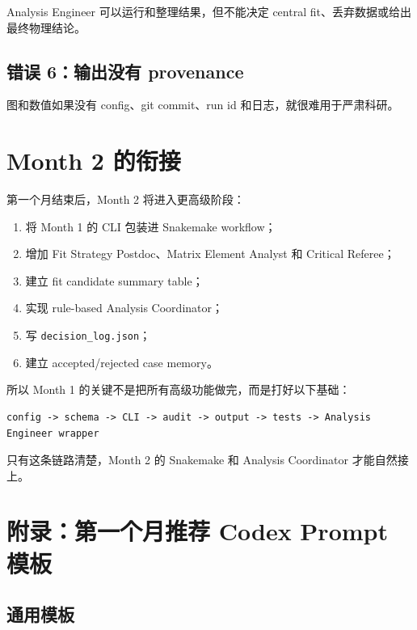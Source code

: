 \documentclass[11pt,a4paper,fontset=fandol]{ctexart}
\begin{document}
Analysis Engineer 可以运行和整理结果，但不能决定 central fit、丢弃数据或给出最终物理结论。

\subsection{错误 6：输出没有 provenance}

图和数值如果没有 config、git commit、run id 和日志，就很难用于严肃科研。

\section{Month 2 的衔接}

第一个月结束后，Month 2 将进入更高级阶段：

\begin{enumerate}[leftmargin=2em]
  \item 将 Month 1 的 CLI 包装进 Snakemake workflow；
  \item 增加 Fit Strategy Postdoc、Matrix Element Analyst 和 Critical Referee；
  \item 建立 fit candidate summary table；
  \item 实现 rule-based Analysis Coordinator；
  \item 写 \texttt{decision\_log.json}；
  \item 建立 accepted/rejected case memory。
\end{enumerate}

所以 Month 1 的关键不是把所有高级功能做完，而是打好以下基础：

\begin{lstlisting}
config -> schema -> CLI -> audit -> output -> tests -> Analysis Engineer wrapper
\end{lstlisting}

只有这条链路清楚，Month 2 的 Snakemake 和 Analysis Coordinator 才能自然接上。

\section{附录：第一个月推荐 Codex Prompt 模板}

\subsection{通用模板}
\end{document}
